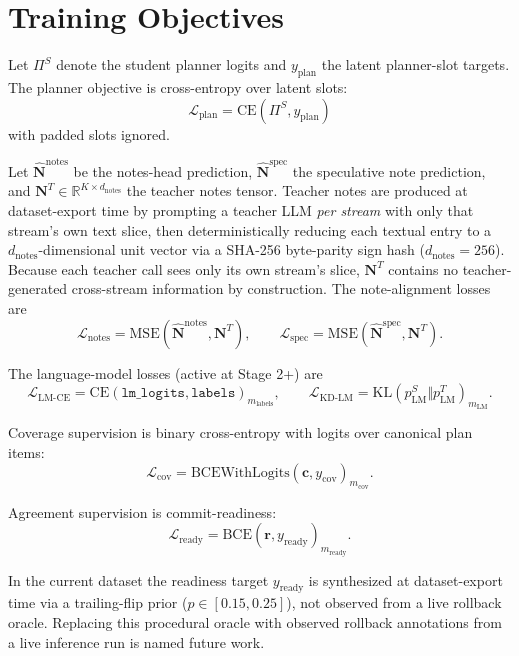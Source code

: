 \appendix

\section{Training Objectives}

Let $\Pi^S$ denote the student planner logits and $y_{\text{plan}}$ the latent planner-slot targets. The planner objective is cross-entropy over latent slots:
\[
\mathcal{L}_{\text{plan}} = \mathrm{CE}(\Pi^S, y_{\text{plan}})
\]
with padded slots ignored.

Let $\widehat{\mathbf{N}}^{\text{notes}}$ be the notes-head prediction, $\widehat{\mathbf{N}}^{\text{spec}}$ the speculative note prediction, and $\mathbf{N}^T \in \mathbb{R}^{K \times d_{\text{notes}}}$ the teacher notes tensor. Teacher notes are produced at dataset-export time by prompting a teacher LLM \emph{per stream} with only that stream's own text slice, then deterministically reducing each textual entry to a $d_{\text{notes}}$-dimensional unit vector via a SHA-256 byte-parity sign hash ($d_{\text{notes}} = 256$). Because each teacher call sees only its own stream's slice, $\mathbf{N}^T$ contains no teacher-generated cross-stream information by construction. The note-alignment losses are
\[
\mathcal{L}_{\text{notes}} = \mathrm{MSE}(\widehat{\mathbf{N}}^{\text{notes}}, \mathbf{N}^T), \qquad
\mathcal{L}_{\text{spec}} = \mathrm{MSE}(\widehat{\mathbf{N}}^{\text{spec}}, \mathbf{N}^T).
\]

The language-model losses (active at Stage 2+) are
\[
\mathcal{L}_{\text{LM-CE}} = \mathrm{CE}(\texttt{lm\_logits}, \texttt{labels})_{m_{\text{labels}}}, \qquad
\mathcal{L}_{\text{KD-LM}} = \mathrm{KL}(p^S_{\text{LM}} \Vert p^T_{\text{LM}})_{m_{\text{LM}}}.
\]

Coverage supervision is binary cross-entropy with logits over canonical plan items:
\[
\mathcal{L}_{\text{cov}} = \mathrm{BCEWithLogits}(\mathbf{c}, y_{\text{cov}})_{m_{\text{cov}}}.
\]

Agreement supervision is commit-readiness:
\[
\mathcal{L}_{\text{ready}} = \mathrm{BCE}(\mathbf{r}, y_{\text{ready}})_{m_{\text{ready}}}.
\]

In the current dataset the readiness target $y_{\text{ready}}$ is synthesized at dataset-export time via a trailing-flip prior ($p \in [0.15, 0.25]$), not observed from a live rollback oracle. Replacing this procedural oracle with observed rollback annotations from a live inference run is named future work.

